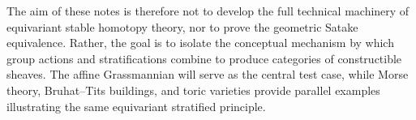 The aim of these notes is therefore not to develop the full technical machinery
of equivariant stable homotopy theory, nor to prove the geometric Satake
equivalence. Rather, the goal is to isolate the conceptual mechanism by which
group actions and stratifications combine to produce categories of
constructible sheaves. The affine Grassmannian will serve as the central test
case, while Morse theory, Bruhat--Tits buildings, and toric varieties provide
parallel examples illustrating the same equivariant stratified principle.